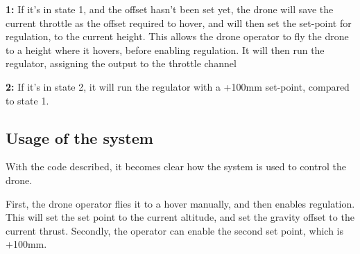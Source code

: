 \textbf{1:}
If it's in state 1, and the offset hasn't been set yet, the drone will save the current throttle as the offset required to hover, and will then set the set-point for regulation, to the current height.
This allows the drone operator to fly the drone to a height where it hovers, before enabling regulation. 
It will then run the regulator, assigning the output to the throttle channel

\textbf{2:}
If it's in state 2, it will run the regulator with a +100mm set-point, compared to state 1.

\subsection*{Usage of the system}
With the code described, it becomes clear how the system is used to control the drone.

First, the drone operator flies it to a hover manually, and then enables regulation. This will set the set point to the current altitude, and set the gravity offset to the current thrust. Secondly, the operator can enable the second set point, which is +100mm.
